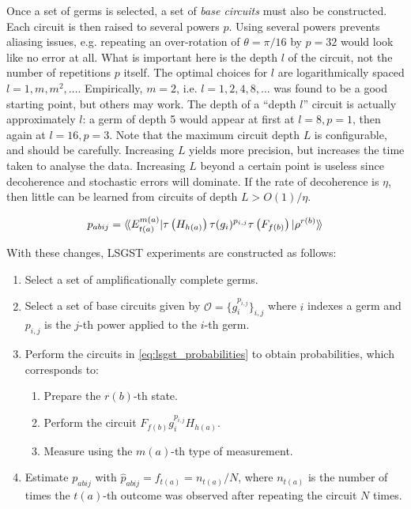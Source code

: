 Once a set of germs is selected, a set of \textit{base circuits} must also be constructed. Each
circuit is then raised to several powers $p$. Using several powers prevents aliasing issues, e.g.
repeating an over-rotation of $\theta = \pi / 16$ by $p = 32$ would look like no error at all. What
is important here is the depth $l$ of the circuit, not the number of repetitions $p$ itself. The
optimal choices for $l$ are logarithmically spaced $l = 1, m, m^2, \dots$. Empirically, $m = 2$, i.e.
$l = 1, 2, 4, 8, \dots$ was found to be a good starting point, but others may work. The depth of a
``depth $l$'' circuit is actually approximately $l$: a germ of depth 5 would appear at first at $l =
8, p = 1$, then again at $l = 16, p = 3$. Note that the maximum circuit depth $L$ is configurable,
and should be carefully. Increasing $L$ yields more precision, but increases the time taken to
analyse the data. Increasing $L$ beyond a certain point is useless since decoherence and stochastic
errors will dominate. If the rate of decoherence is $\eta$, then little can be learned from circuits
of depth $L > O(1) / \eta$.

\vspace{1em}

\begin{equation} \label{eq:lsgst_probabilities}
    p_{abij} = \langle\!\braket{E_{t(a)}^{m(a)} | \tau\left(H_{h(a)}\right) \tau(g_i)^{p_{i,j}} \tau\left(F_{f(b)}\right) | \rho^{r(b)}}\!\rangle
\end{equation}

\vspace{1em}

\noindent With these changes, \ac{LSGST} experiments are constructed as follows:
\begin{enumerate}
    \item Select a set of amplificationally complete germs.
    \item Select a set of base circuits given by $\mathcal{O} = \{g_i^{p_{i,j}}\}_{i,j}$ where $i$
    indexes a germ and $p_{i, j}$ is the $j$-th power applied to the $i$-th germ.
    \item Perform the circuits in \ref{eq:lsgst_probabilities} to obtain probabilities, which
    corresponds to:
    \begin{enumerate}
        \item Prepare the $r(b)$-th state.
        \item Perform the circuit $F_{f(b)} g_i^{p_{i, j}} H_{h(a)}$.
        \item Measure using the $m(a)$-th type of measurement.
    \end{enumerate}
    \item Estimate $p_{abij}$ with $\hat{p}_{abij} = f_{t(a)} = n_{t(a)} / N$, where $n_{t(a)}$ is
    the number of times the $t(a)$-th outcome was observed after repeating the circuit $N$ times.
\end{enumerate}

